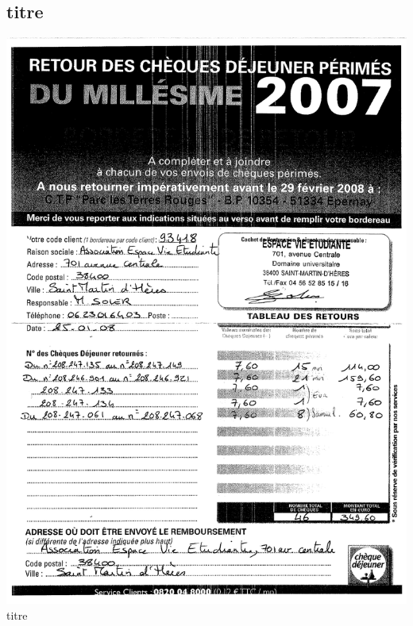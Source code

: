 \subsection{titre}
\begin{center}
\includegraphics[scale=0.6]{annexes/images/chequedejeuner_retour.pdf} \\
titre
\end{center}
